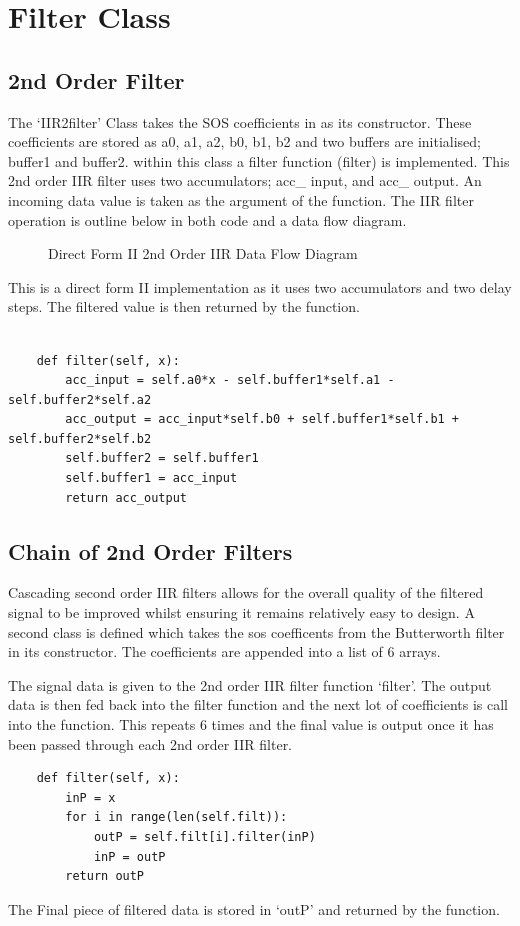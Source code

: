 \documentclass{article}
\begin{document}
\section{Filter Class}


\subsection{2nd Order Filter}
The `IIR2filter' Class takes the SOS coefficients in as its constructor. These coefficients are stored as a0, a1, a2, b0, b1, b2 and two buffers are initialised; buffer1 and buffer2. within this class a filter function (filter) is implemented. This 2nd order IIR filter uses two accumulators; acc\_ input, and acc\_ output. An incoming data value is taken as the argument of the function. The IIR filter operation is outline below in both code and a data flow diagram.
\newline
\begin{figure}[h!]
    \centering
    
    \caption{Direct Form II 2nd Order IIR Data Flow Diagram }
    \label{fig:dataFlow}
\end{figure}
\newline 
This is a direct form II implementation as it uses two accumulators and two delay steps. The filtered value is then returned by the function. 
\newline
\newline
\begin{lstlisting}

    def filter(self, x): 
        acc_input = self.a0*x - self.buffer1*self.a1 - self.buffer2*self.a2 
        acc_output = acc_input*self.b0 + self.buffer1*self.b1 + self.buffer2*self.b2 
        self.buffer2 = self.buffer1
        self.buffer1 = acc_input
        return acc_output
\end{lstlisting}

\subsection{Chain of 2nd Order Filters}

Cascading second order IIR filters allows for the overall quality of the filtered signal to be improved whilst ensuring it remains relatively easy to design. A second class is defined which takes the sos coefficents from the Butterworth filter in its constructor. The coefficients are appended into a list of 6 arrays. 

The signal data is given to the 2nd order IIR filter function `filter'. The output data is then fed back into the filter function and the next lot of coefficients is call into the function. This repeats 6 times and the final value is output once it has been passed through each 2nd order IIR filter. 
\newline
\begin{lstlisting}
    def filter(self, x): 
        inP = x
        for i in range(len(self.filt)):
            outP = self.filt[i].filter(inP)
            inP = outP
        return outP
\end{lstlisting}
The Final piece of filtered data is stored in `outP' and returned by the function. 
\end{document}
